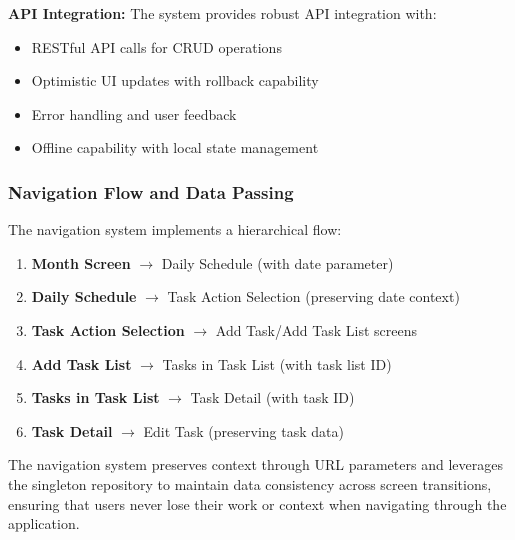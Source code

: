\textbf{API Integration:}
The system provides robust API integration with:
\begin{itemize}
    \item RESTful API calls for CRUD operations
    \item Optimistic UI updates with rollback capability
    \item Error handling and user feedback
    \item Offline capability with local state management
\end{itemize}

\subsubsection{Navigation Flow and Data Passing}

The navigation system implements a hierarchical flow:

\begin{enumerate}
    \item \textbf{Month Screen} $\rightarrow$ Daily Schedule (with date parameter)
    \item \textbf{Daily Schedule} $\rightarrow$ Task Action Selection (preserving date context)
    \item \textbf{Task Action Selection} $\rightarrow$ Add Task/Add Task List screens
    \item \textbf{Add Task List} $\rightarrow$ Tasks in Task List (with task list ID)
    \item \textbf{Tasks in Task List} $\rightarrow$ Task Detail (with task ID)
    \item \textbf{Task Detail} $\rightarrow$ Edit Task (preserving task data)
\end{enumerate}

The navigation system preserves context through URL parameters and leverages the singleton repository to maintain data consistency across screen transitions, ensuring that users never lose their work or context when navigating through the application.